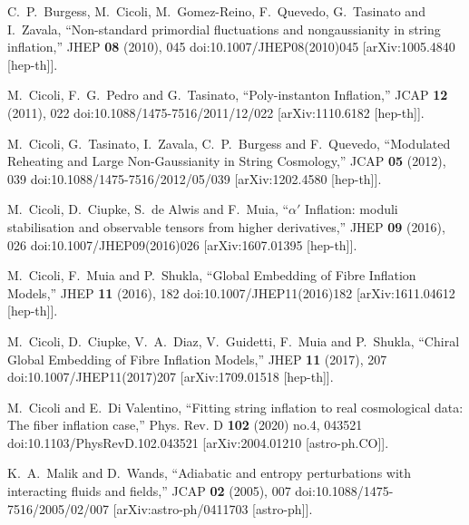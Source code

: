 \documentclass[a4paper,11pt]{article}
\begin{document}
\begin{thebibliography}{10}
C.~P.~Burgess, M.~Cicoli, M.~Gomez-Reino, F.~Quevedo, G.~Tasinato and I.~Zavala,
``Non-standard primordial fluctuations and nongaussianity in string inflation,''
JHEP \textbf{08} (2010), 045
doi:10.1007/JHEP08(2010)045
[arXiv:1005.4840 [hep-th]].

M.~Cicoli, F.~G.~Pedro and G.~Tasinato,
``Poly-instanton Inflation,''
JCAP \textbf{12} (2011), 022
doi:10.1088/1475-7516/2011/12/022
[arXiv:1110.6182 [hep-th]].

M.~Cicoli, G.~Tasinato, I.~Zavala, C.~P.~Burgess and F.~Quevedo,
``Modulated Reheating and Large Non-Gaussianity in String Cosmology,''
JCAP \textbf{05} (2012), 039
doi:10.1088/1475-7516/2012/05/039
[arXiv:1202.4580 [hep-th]].

M.~Cicoli, D.~Ciupke, S.~de Alwis and F.~Muia,
``$\alpha'$ Inflation: moduli stabilisation and observable tensors from higher derivatives,''
JHEP \textbf{09} (2016), 026
doi:10.1007/JHEP09(2016)026
[arXiv:1607.01395 [hep-th]].

M.~Cicoli, F.~Muia and P.~Shukla,
``Global Embedding of Fibre Inflation Models,''
JHEP \textbf{11} (2016), 182
doi:10.1007/JHEP11(2016)182
[arXiv:1611.04612 [hep-th]].

M.~Cicoli, D.~Ciupke, V.~A.~Diaz, V.~Guidetti, F.~Muia and P.~Shukla,
``Chiral Global Embedding of Fibre Inflation Models,''
JHEP \textbf{11} (2017), 207
doi:10.1007/JHEP11(2017)207
[arXiv:1709.01518 [hep-th]].

M.~Cicoli and E.~Di Valentino,
``Fitting string inflation to real cosmological data: The fiber inflation case,''
Phys. Rev. D \textbf{102} (2020) no.4, 043521
doi:10.1103/PhysRevD.102.043521
[arXiv:2004.01210 [astro-ph.CO]].

K.~A.~Malik and D.~Wands,
``Adiabatic and entropy perturbations with interacting fluids and fields,''
JCAP \textbf{02} (2005), 007
doi:10.1088/1475-7516/2005/02/007
[arXiv:astro-ph/0411703 [astro-ph]].


\end{thebibliography}
\end{document}
